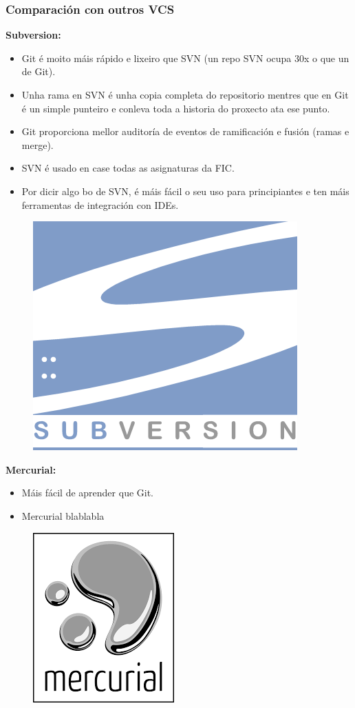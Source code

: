 \begin{frame}
  \frametitle{Comparación con outros VCS}
  \tiny
  \begin{multicols}{2}
    \textbf{Subversion:}
    \begin{itemize}
    \item Git é moito máis rápido e lixeiro que SVN (un repo SVN ocupa 30x o que un de Git).
    \item Unha rama en SVN é unha copia completa do repositorio mentres que en Git é un simple punteiro e conleva toda a historia do proxecto ata ese punto.
    \item Git proporciona mellor auditoría de eventos de ramificación e fusión (ramas e merge).
    \item SVN é usado en case todas as asignaturas da FIC.
    \item Por dicir algo bo de SVN, é máis fácil o seu uso para principiantes e ten máis ferramentas de integración con IDEs.
    \end{itemize}
    \begin{figure}
      \centering
      \includegraphics[width=0.3\linewidth]{./img/svn}
      \label{fig:svn}
    \end{figure}

    \columnbreak

    \textbf{Mercurial:}
    \begin{itemize}
    \item Máis fácil de aprender que Git.
    \item Mercurial blablabla
    \end{itemize}
    \begin{figure}
      \centering
      \includegraphics[width=0.3\linewidth, height=0.2\textheight]{./img/mercurial}
      \label{fig:mercurial}
    \end{figure}
  \end{multicols}
\end{frame}

